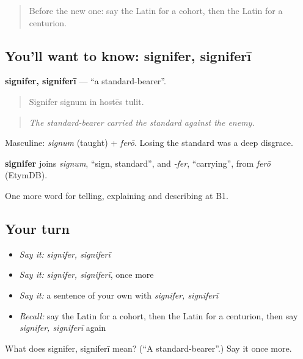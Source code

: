 \begin{quote}
Before the new one: say the Latin for a cohort, then the Latin for a centurion.
\end{quote}

\subsection*{You'll want to know: signifer, signiferī}
\textbf{signifer, signiferī} — \textquotedblleft{}a standard-bearer\textquotedblright{}.

\begin{quote}
Signifer signum in hostēs tulit.
\end{quote}

\begin{quote}
\emph{The standard-bearer carried the standard against the enemy.}
\end{quote}

Masculine: \emph{signum} (taught) + \emph{ferō}. Losing the standard was a deep disgrace.

\begin{cousinweb}
\textbf{signifer} joins \emph{signum}, \textquotedblleft{}sign, standard\textquotedblright{}, and \emph{-fer}, \textquotedblleft{}carrying\textquotedblright{}, from \emph{ferō} (EtymDB).
\end{cousinweb}

\begin{grammarlens}[title={What you've built}]
One more word for telling, explaining and describing at B1.
\end{grammarlens}

\subsection*{Your turn}
\begin{itemize}
\raggedright
  \item \emph{Say it:} \emph{signifer, signiferī}
  \item \emph{Say it:} \emph{signifer, signiferī}, once more
  \item \emph{Say it:} a sentence of your own with \emph{signifer, signiferī}
  \item \emph{Recall:} say the Latin for a cohort, then the Latin for a centurion, then say \emph{signifer, signiferī} again
\end{itemize}

\begin{tcolorbox}[breakable,colback=teal!4,colframe=teal!35!black,title={Before you move on}]
What does signifer, signiferī mean? (\textquotedblleft{}A standard-bearer\textquotedblright{}.) Say it once more.
\end{tcolorbox}
